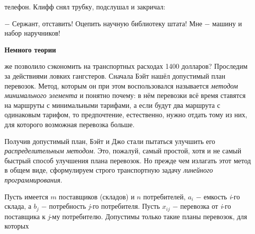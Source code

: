 \begin{minipage}[ht]{0.5\linewidth}
 телефон. Клифф снял трубку, подслушал и закричал:

$-$ Сержант, отставить! Оцепить научную библиотеку штата! Мне $-$ машину и набор наручников!

\bigskip

\noindent\textbf{Немного теории}

\medskip

 же позволило сэкономить на транспортных расходах 1400 долларов? Проследим за действиями ловких гангстеров. Сначала Бэйт нашёл допустимый план перевозок. Метод, которым он при этом воспользовался называется \hspace{2mm}\textit{методом минимального элемента}\hspace{2mm} и понятно почему: в нём перевозки всё время ставятся на маршруты с минимальными тарифами, а если будут два маршрута с одинаковым тарифом, то предпочтение, естественно, нужно отдать тому из них, для которого возможная перевозка больше.

Получив допустимый план, Бэйт и Джо стали пытаться улучшить его \textit{распределительным методом}. Это, пожалуй, самый простой, хотя и не самый быстрый способ улучшения плана перевозок. Но прежде чем излагать этот метод в общем виде, сформулируем строго транспортную задачу \textit{линейного программирования}.

Пусть имеется $m$ поставщиков (складов) и $n$ потребителей, $a_i$ \hspace{1mm}$-$ емкость \textit{i}-го склада, а $b_j$ \hspace{1mm}$-$ потребность \textit{j}-го потребителя. Пусть $x_{i j}$ \hspace{1mm}$-$ перевозка от \textit{i}-го поставщика к \textit{j}-му потребителю. Допустимы только такие планы перевозок, для которых
\end{minipage}

%
